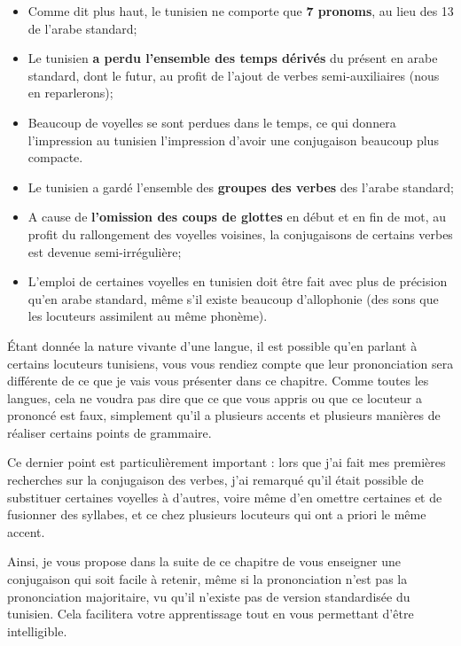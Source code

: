 \begin{itemize}
    \item Comme dit plus haut, le tunisien ne comporte que \textbf{7 pronoms}, au lieu des 13 de l'arabe standard;
    \item Le tunisien \textbf{a perdu l'ensemble des temps dérivés} du présent en arabe standard, dont le futur, au profit de l'ajout de verbes semi-auxiliaires (nous en reparlerons);
    \item Beaucoup de voyelles se sont perdues dans le temps, ce qui donnera \linebreak l'impression au tunisien l'impression d'avoir une conjugaison beaucoup plus compacte.
    \item Le tunisien a gardé l'ensemble des \textbf{groupes des verbes} des l'arabe standard;
    \item A cause de \textbf{l'omission des coups de glottes} en début et en fin de mot, au profit du rallongement des voyelles voisines, la conjugaisons de certains verbes est devenue semi-irrégulière; 
    \item L'emploi de certaines voyelles en tunisien doit être fait avec plus de précision qu'en arabe standard, même s'il existe beaucoup d'allophonie (des sons que les locuteurs assimilent au même phonème).
\end{itemize}

Étant donnée la nature vivante d'une langue, il est possible qu'en parlant à certains locuteurs tunisiens, vous vous rendiez compte que leur prononciation sera différente de ce que je vais vous présenter dans ce chapitre. Comme toutes les langues, cela ne voudra pas dire que ce que vous appris ou que ce locuteur a prononcé est faux, simplement qu'il a plusieurs accents et plusieurs manières de réaliser certains points de grammaire. 

Ce dernier point est particulièrement important : lors que j'ai fait mes premières recherches sur la conjugaison des verbes, j'ai remarqué qu'il était possible de substituer certaines voyelles à d'autres, voire même d'en omettre certaines et de fusionner des syllabes, et ce chez plusieurs locuteurs qui ont a priori le même accent. 

Ainsi, je vous propose dans la suite de ce chapitre de vous enseigner une conjugaison qui soit facile à retenir, même si la prononciation n'est pas la prononciation majoritaire, vu qu'il n'existe pas de version standardisée du tunisien. Cela facilitera votre apprentissage tout en vous permettant d'être intelligible.

